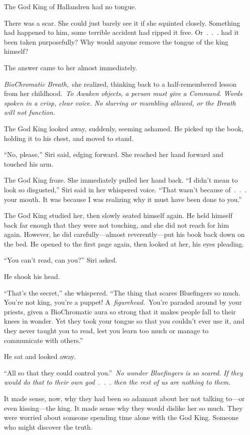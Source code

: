 The God King of Hallandren had no tongue.

There was a scar. She could just barely see it if she squinted closely. Something had happened to him, some terrible accident had ripped it free. Or~.~.~. had it been taken purposefully? Why would anyone remove the tongue of the king himself?

The answer came to her almost immediately.

\textit{BioChromatic Breath,}~she realized, thinking back to a half-remembered lesson from her childhood.~\textit{To Awaken objects, a person must give a Command. Words spoken in a crisp, clear voice. No slurring or mumbling allowed, or the Breath will not function.}

The God King looked away, suddenly, seeming ashamed. He picked up the book, holding it to his chest, and moved to stand.

“No, please,” Siri said, edging forward. She reached her hand forward and touched his arm.

The God King froze. She immediately pulled her hand back. “I didn’t mean to look so disgusted,” Siri said in her whispered voice. “That wasn’t because of~.~.~. your mouth. It was because I was realizing why it must have been done to you.”

The God King studied her, then slowly seated himself again. He held himself back far enough that they were not touching, and she did not reach for him again. However, he did carefully—almost reverently—put his book back down on the bed. He opened to the first page again, then looked at her, his eyes pleading.

“You can’t read, can you?” Siri asked.

He shook his head.

“That’s the secret,” she whispered. “The thing that scares Bluefingers so much. You’re not king, you’re a puppet! A~\textit{figurehead.}~You’re paraded around by your priests, given a BioChromatic aura so strong that it makes people fall to their knees in wonder. Yet they took your tongue so that you couldn’t ever use it, and they never taught you to read, lest you learn too much or manage to communicate with others.”

He sat and looked away.

“All so that they could control you.”~\textit{No wonder Bluefingers is so scared. If they would do that to their own god~.~.~. then the rest of us are nothing to them.}

It made sense, now, why they had been so adamant about her not talking to—or even kissing—the king. It made sense why they would dislike her so much. They were worried about someone spending time alone with the God King. Someone who might discover the truth.

